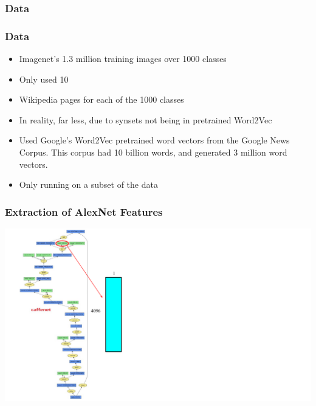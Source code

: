 \documentclass{beamer}
\begin{document}
\begin{frame}
  \frametitle{Data}
\end{frame}

\begin{frame}
  \frametitle{Data}
  \begin{itemize}
  \item Imagenet's 1.3 million training images over 1000 classes
  \item Only used 10%
  \item Wikipedia pages for each of the 1000 classes
  \item In reality, far less, due to synsets not being in pretrained Word2Vec
  \item Used Google's Word2Vec pretrained word vectors from the Google News Corpus.
	This corpus had 10 billion words, and generated 3 million word vectors.
  \item Only running on a subset of the data
  \end{itemize}
\end{frame}

\begin{frame}
  \frametitle{Extraction of AlexNet Features}
  \begin{center}
    \includegraphics[height=0.9\textheight]{assets/CaffeNetFeatures.pdf}
  \end{center}
\end{frame}
\end{document}
